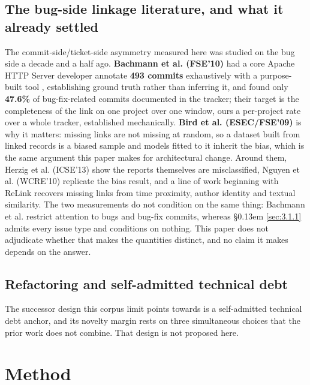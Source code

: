 \documentclass[sigconf,review,anonymous]{acmart}
\begin{document}
\subsection{The bug-side linkage literature, and what it already settled}
\label{sec:2.4}

The commit-side/ticket-side asymmetry measured here was studied on the bug side a decade and a half ago. \textbf{Bachmann et al. (FSE'10)} \cite{bachmann2010missing} had a core Apache HTTP Server developer annotate \textbf{493 commits} exhaustively with a purpose-built tool \cite{bird2010linkster}, establishing ground truth rather than inferring it, and found only \textbf{47.6\%} of bug-fix-related commits documented in the tracker; their target is the completeness of the link on one project over one window, ours a per-project rate over a whole tracker, established mechanically. \textbf{Bird et al. (ESEC/FSE'09)} \cite{bird2009fair} is why it matters: missing links are not missing at random, so a dataset built from linked records is a biased sample and models fitted to it inherit the bias, which is the same argument this paper makes for architectural change. Around them, Herzig et al. (ICSE'13) \cite{herzig2013not} show the reports themselves are misclassified, Nguyen et al. (WCRE'10) \cite{nguyen2010case} replicate the bias result, and a line of work beginning with ReLink \cite{wu2011relink} recovers missing links from time proximity, author identity and textual similarity. The two measurements do not condition on the same thing: Bachmann et al. restrict attention to bugs and bug-fix commits, whereas \S\kern0.13em \ref{sec:3.1.1} admits every issue type and conditions on nothing. This paper does not adjudicate whether that makes the quantities distinct, and no claim it makes depends on the answer.

\subsection{Refactoring and self-admitted technical debt}
\label{sec:2.5}

The successor design this corpus limit points towards is a self-admitted technical debt anchor, and its novelty margin rests on three simultaneous choices that the prior work does not combine. That design is not proposed here.


\section{Method}
\label{sec:3}
\end{document}
